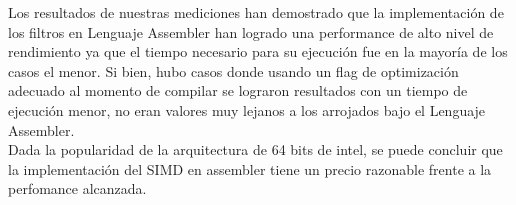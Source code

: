 \documentclass[a4paper]{article}
\begin{document}
Los resultados de nuestras mediciones han demostrado que la implementación de los filtros en Lenguaje Assembler han logrado una performance de alto nivel de rendimiento ya que el tiempo necesario para su ejecuci\'on fue en la mayor\'ia de los casos el menor. Si bien, hubo casos donde usando un flag de optimizaci\'on adecuado al momento de compilar se lograron resultados con un tiempo de ejecuci\'on menor, no eran valores muy lejanos a los arrojados bajo el Lenguaje Assembler. \\

Dada la popularidad de la arquitectura de 64 bits de intel, se puede concluir que la implementación del SIMD en assembler tiene un precio razonable frente a la perfomance alcanzada.\\
\end{document}
